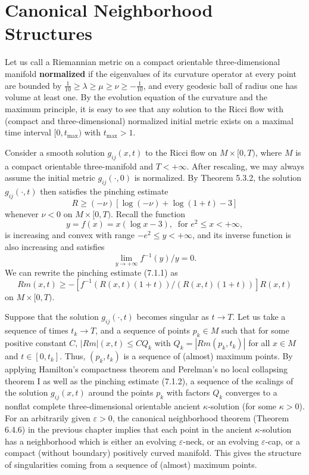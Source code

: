 \section{Canonical Neighborhood Structures}

Let us call a Riemannian metric on a compact orientable
three-dimen\-sional manifold \textbf{normalized}
if the eigenvalues of its curvature operator at every point are
bounded by $\frac{1}{10}\geq \lambda \geq \mu \geq \nu \geq
-\frac{1}{10}$, and every geodesic ball of radius one has volume
at least one. By the evolution equation of the curvature and the
maximum principle, it is easy to see that any solution to the
Ricci flow with (compact and three-dimensional) normalized initial
metric exists on a maximal time interval $[0,t_{\max})$ with
$t_{\max}>1$.

Consider a smooth solution $g_{ij}(x,t)$ to the Ricci flow on
$M\times [0,T)$, where $M$ is a compact orientable three-manifold
and $T<+\infty$. After rescaling, we may always assume the initial
metric $g_{ij}(\cdot,0)$ is normalized. By Theorem 5.3.2, the
solution $g_{ij}(\cdot,t)$ then satisfies the pinching estimate
\begin{equation}
R \geq (-\nu)[\log(-\nu) + \log(1+t) -3] %
\end{equation} whenever $\nu < 0$ on $M\times [0,T)$. Recall the function
$$
y= f(x) = x(\log x - 3), \ \mbox{ for } e^2 \leq x < +\infty,
$$
is increasing and convex with range $-e^2 \leq y < +\infty$, and
its inverse function is also increasing and satisfies
$$
\lim_{y\rightarrow +\infty} f^{-1}(y)/y = 0.
$$
We can rewrite the pinching estimate (7.1.1) as \begin{equation}
Rm(x,t) \geq-[f^{-1}(R(x,t)(1+t))/(R(x,t)(1+t))]R(x,t) %
\end{equation} on $M\times [0,T)$.

Suppose that the solution $g_{ij}(\cdot,t)$ becomes singular as
$t\rightarrow T$. Let us take a sequence of times $t_k \rightarrow
T$, and a sequence of points $p_k \in M$ such that for some
positive constant $C$, $|Rm|(x,t) \leq CQ_k$ with
$Q_k=|Rm(p_k,t_k)|$ for all $x \in M$ and $t \in [0,t_k]$. Thus,
$(p_k,t_k)$ is a sequence of (almost) maximum points. By applying
Hamilton's compactness theorem and Perelman's no local collapsing
theorem I as well as the pinching estimate (7.1.2), a sequence of
the scalings of the solution $g_{ij}(x,t)$ around the points $p_k$
with factors $Q_k$ converges to a nonflat complete
three-dimensional orientable ancient $\kappa$-solution (for some
$\kappa > 0$). For an arbitrarily given $\varepsilon>0$, the
canonical neighborhood theorem (Theorem 6.4.6) in the previous
chapter implies that each point in the ancient $\kappa$-solution
has a neighborhood which is either an evolving $\varepsilon$-neck,
or an evolving $\varepsilon$-cap, or a compact (without boundary)
positively curved manifold. This gives the structure of
singularities coming from a sequence of (almost) maximum points.

